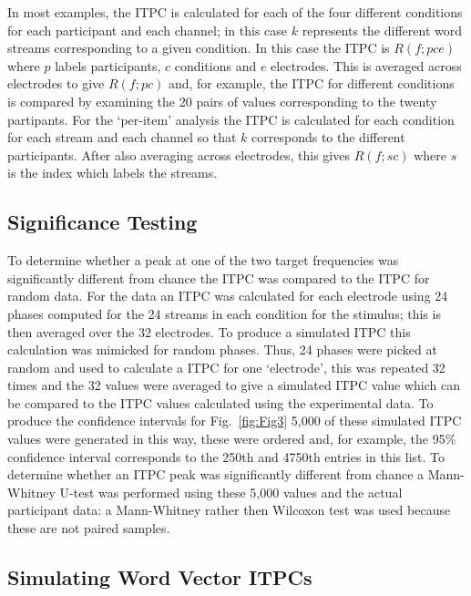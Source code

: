 \documentclass[11pt,a4wide]{article}
\begin{document}
In most examples, the ITPC is calculated for each of the four
different conditions for each participant and each channel; in this
case $k$ represents the different word streams corresponding to a
given condition. In this case the ITPC is $R(f;pce)$ where $p$ labels
participants, $c$ conditions and $e$ electrodes. This is averaged across
electrodes to give $R(f;pc)$ and, for example, the ITPC for different
conditions is compared by examining the 20 pairs of values
corresponding to the twenty partipants. For the `per-item' analysis
the ITPC is calculated for each condition for each stream and each
channel so that $k$ corresponds to the different participants. After
also averaging across electrodes, this gives $R(f;sc)$ where $s$ is
the index which labels the streams.

\subsection*{Significance Testing}

To determine whether a peak at one of the two target frequencies was
significantly different from chance the ITPC was compared to the ITPC
for random data. For the data an ITPC was calculated for each
electrode using 24 phases computed for the 24 streams in each
condition for the stimulus; this is then averaged over the 32
electrodes. To produce a simulated ITPC this calculation was mimicked
for random phases. Thus, 24 phases were picked at random and used to
calculate a ITPC for one `electrode', this was repeated 32 times and
the 32 values were averaged to give a simulated ITPC value which can
be compared to the ITPC values calculated using the experimental
data. To produce the confidence intervals for Fig.~\ref{fig:Fig3}
5,000 of these simulated ITPC values were generated in this way, these
were ordered and, for example, the 95\% confidence interval
corresponds to the 250th and 4750th entries in this list. To determine
whether an ITPC peak was significantly different from chance a
Mann-Whitney U-test was performed using these 5,000 values and the
actual participant data: a Mann-Whitney rather then Wilcoxon test was
used because these are not paired samples.

\subsection*{Simulating Word Vector ITPCs}
\end{document}
